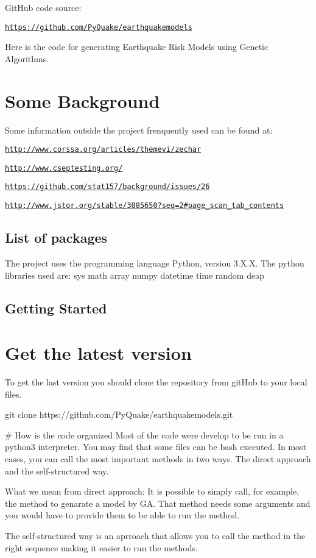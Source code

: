 Git\+Hub code source\+:

\href{https://github.com/PyQuake/earthquakemodels}{\tt https\+://github.\+com/\+Py\+Quake/earthquakemodels}

Here is the code for generating Earthquake Risk Models using Genetic Algorithms.

\section*{Some Background}

Some information outside the project frenquently used can be found at\+:

\href{http://www.corssa.org/articles/themevi/zechar}{\tt http\+://www.\+corssa.\+org/articles/themevi/zechar}

\href{http://www.cseptesting.org/}{\tt http\+://www.\+cseptesting.\+org/}

\href{https://github.com/stat157/background/issues/26}{\tt https\+://github.\+com/stat157/background/issues/26}

\href{http://www.jstor.org/stable/3085650?seq=2#page_scan_tab_contents}{\tt http\+://www.\+jstor.\+org/stable/3085650?seq=2\#page\+\_\+scan\+\_\+tab\+\_\+contents}

\subsection*{List of packages }

The project uses the programming language Python, version 3.\+X.\+X. The python libraries used are\+: sys math array numpy datetime time random deap

\subsection*{Getting Started }

\section*{Get the latest version}

To get the last version you should clone the repository from git\+Hub to your local files. 
\begin{DoxyCode}
git clone https://github.com/PyQuake/earthquakemodels.git

# How is the code organized
Most of the code were develop to be run in a python3 interpreter. 
You may find that some files can be bash executed.
In most cases, you can call the most important methods in two ways. 
The direct approach and the self-structured way. 

What we mean from direct approach: It is possible to simply call, 
for example, the method to genarate a model by GA. That method needs
some arguments and you would have to provide them to be able to run the method. 

The self-structured way is an aprroach that allows you to call the
method in the right sequence making it easier to run the methods.
\end{DoxyCode}


